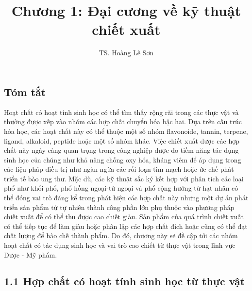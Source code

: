 \documentclass[
  letterpaper,
  DIV=11,
  numbers=noendperiod]{scrartcl}
\title{Chương 1: Đại cương về kỹ thuật chiết xuất}
\author{TS. Hoàng Lê Sơn}
\date{}
\renewcommand*\contentsname{Table of contents}
\newcommand\contentsname{Table of contents}
\begin{document}
\maketitle

\renewcommand*\contentsname{Table of contents}
{
\hypersetup{linkcolor=}
\setcounter{tocdepth}{3}
\tableofcontents
}

\subsection{Tóm tắt}\label{tuxf3m-tux1eaft}

Hoạt chất có hoạt tính sinh học có thể tìm thấy rộng rãi trong các thực
vật và thường được xếp vào nhóm các hợp chất chuyển hóa bậc hai. Dựa
trên cấu trúc hóa học, các hoạt chất này có thể thuộc một số nhóm
flavonoide, tannin, terpene, ligand, alkaloid, peptide hoặc một số nhóm
khác. Việc chiết xuất được các hợp chất này ngày càng quan trọng trong
công nghiệp dược do tiềm năng tác dụng sinh học của chúng như khả năng
chống oxy hóa, kháng viêm để áp dụng trong các liệu pháp điều trị như
ngăn ngừa các rối loạn tim mạch hoặc ức chế phát triển tế bào ung thư.
Mặc dù, các kỹ thuật sắc ký kết hợp với phân tích các loại phổ như khối
phổ, phổ hồng ngoại-tử ngoại và phổ cộng hưởng tử hạt nhân có thể đóng
vai trò đáng kể trong phát hiện các hợp chất này nhưng một dự án phát
triển sản phẩm từ tự nhiên thành công phần lớn phụ thuộc vào phương pháp
chiết xuất để có thể thu được cao chiết giàu. Sản phẩm của quá trình
chiết xuất có thể tiếp tục để làm giàu hoặc phân lập các hợp chất đích
hoặc cũng có thể đạt chất lượng để bào chế thành phẩm. Do đó, chương này
sẽ đề cập tới các nhóm hoạt chất có tác dụng sinh học và vai trò cao
chiết từ thực vật trong lĩnh vực Dược - Mỹ phẩm.

\subsection{1.1 Hợp chất có hoạt tính sinh học từ thực
vật}\label{hux1ee3p-chux1ea5t-cuxf3-houx1ea1t-tuxednh-sinh-hux1ecdc-tux1eeb-thux1ef1c-vux1eadt}
\end{document}
